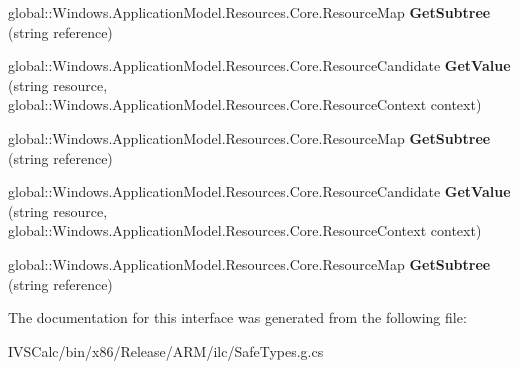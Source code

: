 \begin{DoxyCompactItemize}
\item 
\mbox{\label{interface_windows_1_1_application_model_1_1_resources_1_1_core_1_1_i_resource_map_a7f6ac609da4239d24df7485f1181c2a6}} 
global\+::\+Windows.\+Application\+Model.\+Resources.\+Core.\+Resource\+Map {\bfseries Get\+Subtree} (string reference)
\item 
\mbox{\label{interface_windows_1_1_application_model_1_1_resources_1_1_core_1_1_i_resource_map_a10c5402ab664421631fa20105c6ea848}} 
global\+::\+Windows.\+Application\+Model.\+Resources.\+Core.\+Resource\+Candidate {\bfseries Get\+Value} (string resource, global\+::\+Windows.\+Application\+Model.\+Resources.\+Core.\+Resource\+Context context)
\item 
\mbox{\label{interface_windows_1_1_application_model_1_1_resources_1_1_core_1_1_i_resource_map_a7f6ac609da4239d24df7485f1181c2a6}} 
global\+::\+Windows.\+Application\+Model.\+Resources.\+Core.\+Resource\+Map {\bfseries Get\+Subtree} (string reference)
\item 
\mbox{\label{interface_windows_1_1_application_model_1_1_resources_1_1_core_1_1_i_resource_map_a10c5402ab664421631fa20105c6ea848}} 
global\+::\+Windows.\+Application\+Model.\+Resources.\+Core.\+Resource\+Candidate {\bfseries Get\+Value} (string resource, global\+::\+Windows.\+Application\+Model.\+Resources.\+Core.\+Resource\+Context context)
\item 
\mbox{\label{interface_windows_1_1_application_model_1_1_resources_1_1_core_1_1_i_resource_map_a7f6ac609da4239d24df7485f1181c2a6}} 
global\+::\+Windows.\+Application\+Model.\+Resources.\+Core.\+Resource\+Map {\bfseries Get\+Subtree} (string reference)
\end{DoxyCompactItemize}


The documentation for this interface was generated from the following file\+:\begin{DoxyCompactItemize}
\item 
I\+V\+S\+Calc/bin/x86/\+Release/\+A\+R\+M/ilc/Safe\+Types.\+g.\+cs\end{DoxyCompactItemize}
